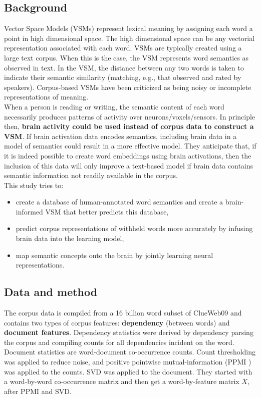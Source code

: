 \subsection{Background}
Vector Space Models (VSMs) represent lexical meaning by assigning each word a point in high dimensional space. The high dimensional space can be any vectorial representation associated with each word. VSMs are typically created using a large text corpus. When this is the case, the VSM represents word semantics as observed in text. In the VSM, the distance between any two words is taken to indicate their semantic similarity (matching, e.g., that observed and rated by speakers). Corpus-based VSMs have been criticized as being noisy or incomplete representations of meaning.\\

When a person is reading or writing, the semantic content of each word necessarily produces patterns of activity over neurons/voxels/sensors. In principle then, \textbf{brain activity could be used instead of corpus data to construct a VSM}. If brain activation data encodes semantics, including brain data in a model of semantics could result in a more effective model. They anticipate that, if it is indeed possible to create word embeddings using brain activations, then the inclusion of this data will only improve a text-based model if brain data contains semantic information not readily available in the corpus.\\

This study tries to:
\begin{itemize}
    \item create a database of human-annotated word semantics and create a brain-informed VSM that better predicts this database,
    \item predict corpus representations of withheld words more accurately by infusing brain data into the learning model,
    \item map semantic concepts onto the brain by jointly learning neural representations.
\end{itemize}

\subsection{Data and method}
The corpus data is compiled from a 16 billion word subset of ClueWeb09 and contains two types of corpus features: \textbf{dependency} (between words) and \textbf{document features}. Dependency statistics were derived by dependency parsing the corpus and compiling counts for all dependencies incident on the word. Document statistics are word-document co-occurrence counts. Count thresholding was applied to reduce noise, and positive pointwise mutual-information (PPMI \notet) was applied to the counts. SVD was applied to the document. They started with a word-by-word co-occurrence matrix and then get a word-by-feature matrix $X$, after PPMI and SVD.

